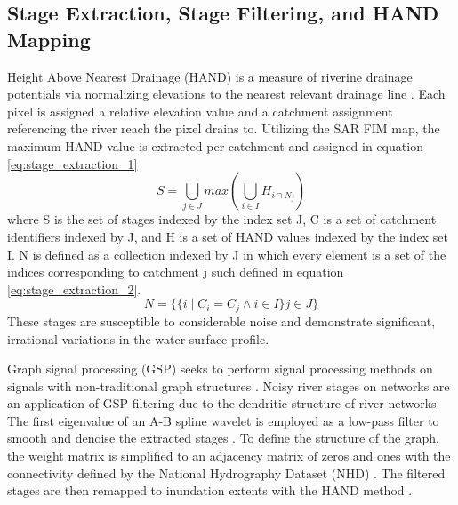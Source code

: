 \documentclass{article}
\begin{document}
\subsection{Stage Extraction, Stage Filtering, and HAND Mapping}
\label{ssec:stage_extraction_filter_mapping}
%
Height Above Nearest Drainage (HAND) is a measure of riverine drainage potentials via normalizing elevations to the nearest relevant drainage line \cite{nobre2016hand,aristizabal2020cahaba}. 
Each pixel is assigned a relative elevation value and a catchment assignment referencing the river reach the pixel drains to.
Utilizing the SAR FIM map, the maximum HAND value is extracted per catchment and assigned in equation \ref{eq:stage_extraction_1} 
%
\begin{equation}
\label{eq:stage_extraction_1}
S = \bigcup_{j \in J} max(\bigcup_{i \in I} H_{i \cap N_j})
\end{equation}
%
where S is the set of stages indexed by the index set J, C is a set of catchment identifiers indexed by J, and H is a set of HAND values indexed by the index set I.
N is defined as a collection indexed by J in which every element is a set of the indices corresponding to catchment j such defined in equation \ref{eq:stage_extraction_2}.
%
\begin{equation}
\label{eq:stage_extraction_2}
N = \{\{ i \mid C_i=C_j \land i \in I \} j \in J \}
\end{equation}
%
These stages are susceptible to considerable noise and demonstrate significant, irrational variations in the water surface profile. 

Graph signal processing (GSP) seeks to perform signal processing methods on signals with non-traditional graph structures \cite{gavili2017shift,defferrard2017pygsp,ortega2018graph}. 
Noisy river stages on networks are an application of GSP filtering due to the dendritic structure of river networks.
The first eigenvalue of an A-B spline wavelet is employed as a low-pass filter to smooth and denoise the extracted stages \cite{defferrard2017pygsp}.
To define the structure of the graph, the weight matrix is simplified to an adjacency matrix of zeros and ones with the connectivity defined by the National Hydrography Dataset (NHD) \cite{usgs2019national}.
The filtered stages are then remapped to inundation extents with the HAND method \cite{nobre2016hand,aristizabal2020cahaba}.   
%
\end{document}

